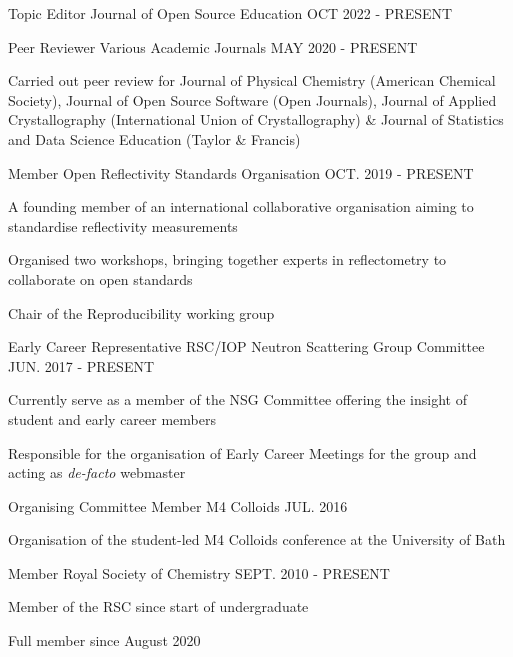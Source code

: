 \begin{cventries}
  \cventry
    {Topic Editor}
    {Journal of Open Source Education}
    {}
    {OCT 2022 - PRESENT}
    {
    	\begin{cvitems}
	    \item{Served as a topic editor for the Journal of Open Source Education (Open Journals)
	\end{cvitems}
    }
  \cventry
    {Peer Reviewer}
    {Various Academic Journals}
    {}
    {MAY 2020 - PRESENT}
    {
        \begin{cvitems}
            \item{Carried out peer review for Journal of Physical Chemistry (American Chemical Society), Journal of Open Source Software (Open Journals), Journal of Applied Crystallography (International Union of Crystallography) \& Journal of Statistics and Data Science Education (Taylor \& Francis)}
        \end{cvitems}
    }
  \cventry
    {Member}
    {Open Reflectivity Standards Organisation}
    {}
    {OCT. 2019 - PRESENT}
    {
      \begin {cvitems}
        \item {A founding member of an international collaborative organisation aiming to standardise reflectivity measurements}
        \item {Organised two workshops, bringing together experts in reflectometry to collaborate on open standards}
        \item {Chair of the Reproducibility working group}
      \end {cvitems}
    }
  \cventry
  	{Early Career Representative}
    {RSC/IOP Neutron Scattering Group Committee}
    {}
    {JUN. 2017 - PRESENT}
    {
      \begin{cvitems}
      	\item{Currently serve as a member of the NSG Committee offering the insight of student and early career members}
      	\item{Responsible for the organisation of Early Career Meetings for the group and acting as \emph{de-facto} webmaster}
	  \end{cvitems}
	}
  \cventry
    {Organising Committee Member}
    {M4 Colloids}
    {}
    {JUL. 2016}
    {
      \begin{cvitems}
        \item{Organisation of the student-led M4 Colloids conference at the University of Bath}
      \end{cvitems}
    }
  \cventry
    {Member}
    {Royal Society of Chemistry}
    {}
    {SEPT. 2010 - PRESENT}
    {
      \begin{cvitems}
      	\item{Member of the RSC since start of undergraduate}
      	\item{Full member since August 2020}
      \end{cvitems}
    }
\end{cventries}
